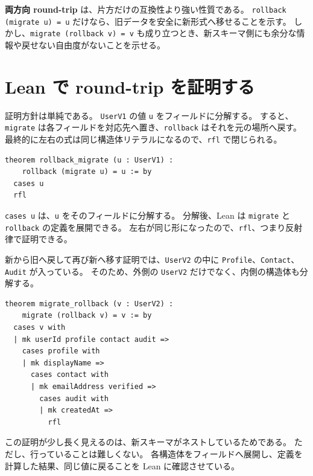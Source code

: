 \begin{definitionbox}
\textbf{両方向 round-trip} は、片方だけの互換性より強い性質である。
\texttt{rollback (migrate u) = u} だけなら、旧データを安全に新形式へ移せることを示す。
しかし、\texttt{migrate (rollback v) = v} も成り立つとき、新スキーマ側にも余分な情報や戻せない自由度がないことを示せる。
\end{definitionbox}

\section{Lean で round-trip を証明する}

証明方針は単純である。
\texttt{UserV1} の値 \texttt{u} をフィールドに分解する。
すると、\texttt{migrate} は各フィールドを対応先へ置き、\texttt{rollback} はそれを元の場所へ戻す。
最終的に左右の式は同じ構造体リテラルになるので、\texttt{rfl} で閉じられる。

\begin{listing}[htbp]
\begin{verbatim}
theorem rollback_migrate (u : UserV1) :
    rollback (migrate u) = u := by
  cases u
  rfl
\end{verbatim}
\caption{旧から新へ移して戻す round-trip 証明}
\label{lst:ch22-rollback-migrate}
\end{listing}

\texttt{cases u} は、\texttt{u} をそのフィールドに分解する。
分解後、Lean は \texttt{migrate} と \texttt{rollback} の定義を展開できる。
左右が同じ形になったので、\texttt{rfl}、つまり反射律で証明できる。

新から旧へ戻して再び新へ移す証明では、\texttt{UserV2} の中に \texttt{Profile}、\texttt{Contact}、\texttt{Audit} が入っている。
そのため、外側の \texttt{UserV2} だけでなく、内側の構造体も分解する。

\begin{listing}[htbp]
\begin{verbatim}
theorem migrate_rollback (v : UserV2) :
    migrate (rollback v) = v := by
  cases v with
  | mk userId profile contact audit =>
    cases profile with
    | mk displayName =>
      cases contact with
      | mk emailAddress verified =>
        cases audit with
        | mk createdAt =>
          rfl
\end{verbatim}
\caption{新から旧へ戻して再び新へ移す round-trip 証明}
\label{lst:ch22-migrate-rollback}
\end{listing}

この証明が少し長く見えるのは、新スキーマがネストしているためである。
ただし、行っていることは難しくない。
各構造体をフィールドへ展開し、定義を計算した結果、同じ値に戻ることを Lean に確認させている。

